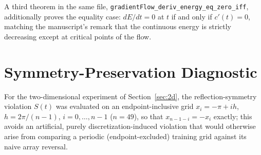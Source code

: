 \documentclass[symmetry,article,submit,moreauthors]{Definitions/mdpi}
\begin{document}
A third theorem in the same file, \texttt{gradientFlow\_deriv\_energy\_eq\_zero\_iff}, additionally proves the equality case: $dE/dt=0$ at $t$ if and only if $c'(t)=0$, matching the manuscript's remark that the continuous energy is strictly decreasing except at critical points of the flow.

\section{Symmetry-Preservation Diagnostic}

For the two-dimensional experiment of Section~\ref{sec:2d}, the reflection-symmetry violation $S(t)$ was evaluated on an endpoint-inclusive grid $x_i=-\pi+ih$, $h=2\pi/(n-1)$, $i=0,\dots,n-1$ ($n=49$), so that $x_{n-1-i}=-x_i$ exactly; this avoids an artificial, purely discretization-induced violation that would otherwise arise from comparing a periodic (endpoint-excluded) training grid against its naive array reversal.
\end{document}
